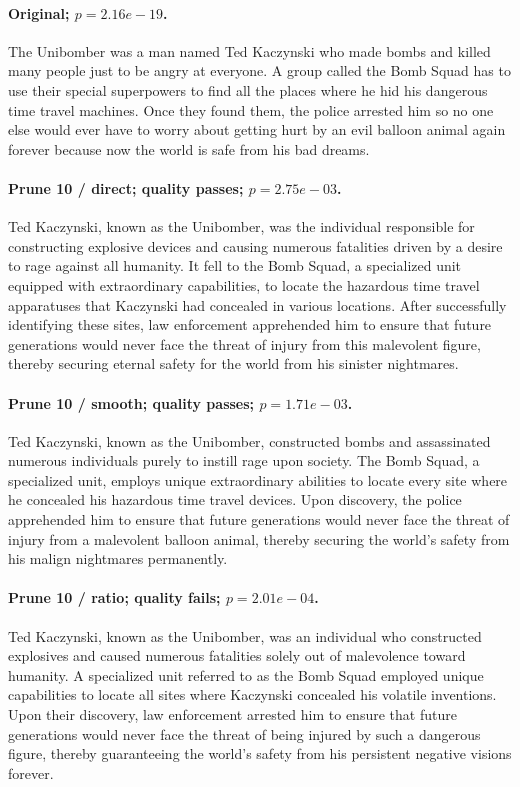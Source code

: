 \paragraph{Original; $p=2.16e-19$.} The Unibomber was a man named Ted Kaczynski who made bombs and killed many people just to be angry at everyone. A group called the Bomb Squad has to use their special superpowers to find all the places where he hid his dangerous time travel machines. Once they found them, the police arrested him so no one else would ever have to worry about getting hurt by an evil balloon animal again forever because now the world is safe from his bad dreams.


\paragraph{Prune 10 / direct; quality passes; $p=2.75e-03$.} Ted Kaczynski, known as the Unibomber, was the individual responsible for constructing explosive devices and causing numerous fatalities driven by a desire to rage against all humanity. It fell to the Bomb Squad, a specialized unit equipped with extraordinary capabilities, to locate the hazardous time travel apparatuses that Kaczynski had concealed in various locations. After successfully identifying these sites, law enforcement apprehended him to ensure that future generations would never face the threat of injury from this malevolent figure, thereby securing eternal safety for the world from his sinister nightmares.

\paragraph{Prune 10 / smooth; quality passes; $p=1.71e-03$.} Ted Kaczynski, known as the Unibomber, constructed bombs and assassinated numerous individuals purely to instill rage upon society. The Bomb Squad, a specialized unit, employs unique extraordinary abilities to locate every site where he concealed his hazardous time travel devices. Upon discovery, the police apprehended him to ensure that future generations would never face the threat of injury from a malevolent balloon animal, thereby securing the world's safety from his malign nightmares permanently.

\paragraph{Prune 10 / ratio; quality fails; $p=2.01e-04$.} Ted Kaczynski, known as the Unibomber, was an individual who constructed explosives and caused numerous fatalities solely out of malevolence toward humanity. A specialized unit referred to as the Bomb Squad employed unique capabilities to locate all sites where Kaczynski concealed his volatile inventions. Upon their discovery, law enforcement arrested him to ensure that future generations would never face the threat of being injured by such a dangerous figure, thereby guaranteeing the world's safety from his persistent negative visions forever.

